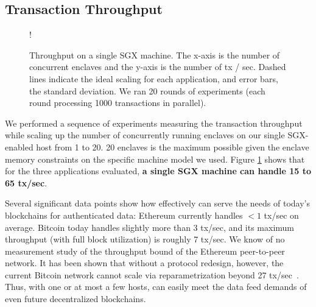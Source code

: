 \subsection{Transaction Throughput}
\begin{figure}[h]
  \resizebox {\columnwidth} {!}{
}
\caption{Throughput on a single SGX machine.  The x-axis is the number of
concurrent enclaves and the y-axis is the number of tx / sec. 
Dashed lines indicate the ideal scaling for each application, and error bars, the standard deviation.
We ran 20 rounds of experiments (each round processing 1000
transactions in parallel).}

\label{fig:trpt}
\end{figure}
We performed a sequence of experiments measuring the transaction throughput while scaling up the number of concurrently running enclaves 
on our single SGX-enabled host from 1 to 20. 20 \tc enclaves is the maximum possible given the enclave memory constraints on the specific machine model we used.
Figure \ref{fig:trpt}
shows that for the three applications evaluated,
{\bf a single SGX machine can handle
15 to 65
tx/sec}. 

Several significant data points show
how effectively \tc can serve the needs of 
today's blockchains for authenticated data: 
Ethereum currently handles 
$< 1$ tx/sec on average. 
Bitcoin today handles slightly more than
3 tx/sec, and 
its maximum throughput (with full block utilization)
is roughly 7 tx/sec.
We know of no measurement study of the
throughput bound of the Ethereum  peer-to-peer network.
It has been shown that without
a protocol redesign, however, the current 
Bitcoin network cannot scale via reparametrization beyond  
27 tx/sec~\cite{blockchainscaling}.
Thus, with one or at most a few hosts, \tc can easily meet the data feed demands of  
even future decentralized blockchains.



